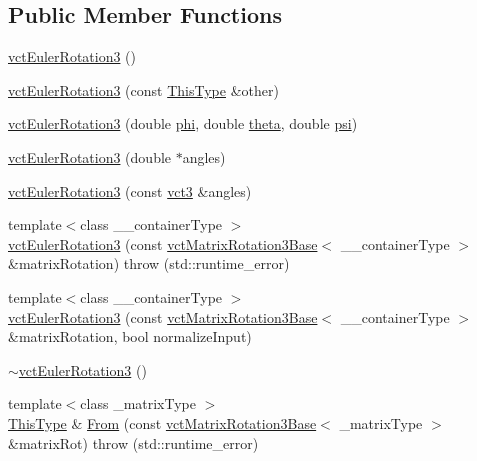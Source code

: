 \subsection*{Public Member Functions}
\begin{DoxyCompactItemize}
\item 
\hyperlink{classvct_euler_rotation3_ab3529b2681173b63a24cc13ae21b90cc}{vct\+Euler\+Rotation3} ()
\item 
\hyperlink{classvct_euler_rotation3_adbf0bb7cc5585c547b65dfe6fe82443b}{vct\+Euler\+Rotation3} (const \hyperlink{classvct_euler_rotation3}{This\+Type} \&other)
\item 
\hyperlink{classvct_euler_rotation3_ae1f5dcea90b5d348646a0615fbf53b25}{vct\+Euler\+Rotation3} (double \hyperlink{classvct_euler_rotation3_base_af2e807e479e504cd47c58b308f25317c}{phi}, double \hyperlink{classvct_euler_rotation3_base_ac74e14d30f7d2077068e2f4b5c7219b1}{theta}, double \hyperlink{classvct_euler_rotation3_base_aeee06e33924728dd210644a390f86522}{psi})
\item 
\hyperlink{classvct_euler_rotation3_a9045944731fa1e4cc42b4122e6f1bdf0}{vct\+Euler\+Rotation3} (double $\ast$angles)
\item 
\hyperlink{classvct_euler_rotation3_ad429f73f7648ca57a353b5629d0c0b29}{vct\+Euler\+Rotation3} (const \hyperlink{vct_fixed_size_vector_types_8h_a3af82acdbf4eeb73c551909240b106ea}{vct3} \&angles)
\item 
{\footnotesize template$<$class \+\_\+\+\_\+container\+Type $>$ }\\\hyperlink{classvct_euler_rotation3_aaf3ee83505b9207c0f7ad9419657e36b}{vct\+Euler\+Rotation3} (const \hyperlink{classvct_matrix_rotation3_base}{vct\+Matrix\+Rotation3\+Base}$<$ \+\_\+\+\_\+container\+Type $>$ \&matrix\+Rotation)  throw (std\+::runtime\+\_\+error)
\item 
{\footnotesize template$<$class \+\_\+\+\_\+container\+Type $>$ }\\\hyperlink{classvct_euler_rotation3_aef23cd376661dd4b2254ae4a60747764}{vct\+Euler\+Rotation3} (const \hyperlink{classvct_matrix_rotation3_base}{vct\+Matrix\+Rotation3\+Base}$<$ \+\_\+\+\_\+container\+Type $>$ \&matrix\+Rotation, bool normalize\+Input)
\item 
\hyperlink{classvct_euler_rotation3_a33ac21cb6c3cb226b4e4acf257891b1e}{$\sim$vct\+Euler\+Rotation3} ()
\item 
{\footnotesize template$<$class \+\_\+matrix\+Type $>$ }\\\hyperlink{classvct_euler_rotation3}{This\+Type} \& \hyperlink{classvct_euler_rotation3_a7c0c91c4f98a99a3fefe2699bb192e90}{From} (const \hyperlink{classvct_matrix_rotation3_base}{vct\+Matrix\+Rotation3\+Base}$<$ \+\_\+matrix\+Type $>$ \&matrix\+Rot)  throw (std\+::runtime\+\_\+error)

\end{DoxyCompactItemize}
